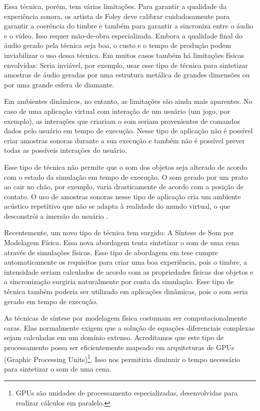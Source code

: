 
Essa técnica, porém, tem várias limitações. Para garantir a qualidade da experiência sonora, os artista de Foley deve calibrar cuidadosamente para garantir a coerência do timbre e também para garantir a sincroniza entre o áudio e o vídeo. Isso requer mão-de-obra especializada. Embora a qualidade final do áudio gerado pela técnica seja boa, o custo e o tempo de produção podem inviabilizar o uso dessa técnica. Em muitos casos também há limitações físicas envolvidas: Seria inviável, por exemplo, usar esse tipo de técnica para sintetizar amostras de áudio geradas por uma estrutura metálica de grandes dimensões ou por uma grande esfera de diamante.

Em ambientes dinâmicos, no entanto, as limitações são ainda mais aparentes. No caso de uma aplicação virtual com interação de um usuário (um jogo, por exemplo), as interações que criariam o som seriam provenientes de comandos dados pelo usuário em tempo de execução. Nesse tipo de aplicação não é possível criar amostras sonoras durante a sua execução e também não é possível prever todas as possíveis interações do usuário.

Esse tipo de técnica não permite que o som dos objetos seja alterado de acordo com o estado da simulação em tempo de execução. O som gerado por um prato ao cair no chão, por exemplo, varia drasticamente de acordo com a posição de contato.  O uso de amostras sonoras nesse tipo de aplicação cria um ambiente acústico repetitivo que não se adapta à realidade do mundo virtual, o que desconstrói a imersão do usuário \cite{anderson1997sound}.

Recentemente, um novo tipo de técnica tem surgido: A Síntese de Som por Modelagem Física. Essa nova abordagem tenta sintetizar o som de uma cena através de simulações físicas. Esse tipo de abordagem em tese cumpre automaticamente os requisitos para criar uma boa experiência, pois o timbre, a intensidade seriam calculados de acordo com as propriedades físicas dos objetos e a sincronização surgiria naturalmente por conta da simulação. Esse tipo de técnica também poderia ser utilizado em aplicações dinâmicas, pois o som seria gerado em tempo de execução.

As técnicas de síntese por modelagem física costumam ser computacionalmente caras. Elas normalmente exigem que a solução de equações diferenciais complexas sejam calculadas em um domínio extenso. Acreditamos que este tipo de processamento possa ser eficientemente mapeado em arquiteturas de GPUs (Graphic Processing Units)\footnote{ GPUs são unidades de processamento especializadas, desenvolvidas para realizar cálculos em paralelo.}. Isso nos permitiria diminuir o tempo necessário para sintetizar o som de uma cena.

